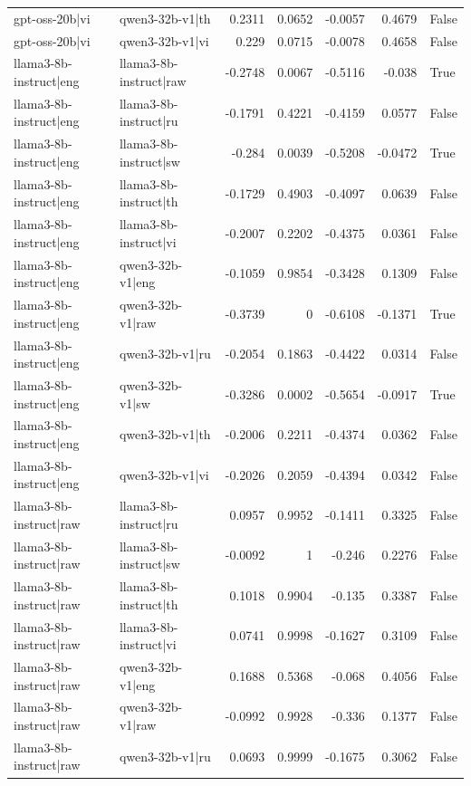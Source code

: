 \begin{table}
\begin{tabular}{l l r r r r l}
gpt-oss-20b|vi & qwen3-32b-v1|th & 0.2311 & 0.0652 & -0.0057 & 0.4679 & False \\
gpt-oss-20b|vi & qwen3-32b-v1|vi & 0.229 & 0.0715 & -0.0078 & 0.4658 & False \\
llama3-8b-instruct|eng & llama3-8b-instruct|raw & -0.2748 & 0.0067 & -0.5116 & -0.038 & True \\
llama3-8b-instruct|eng & llama3-8b-instruct|ru & -0.1791 & 0.4221 & -0.4159 & 0.0577 & False \\
llama3-8b-instruct|eng & llama3-8b-instruct|sw & -0.284 & 0.0039 & -0.5208 & -0.0472 & True \\
llama3-8b-instruct|eng & llama3-8b-instruct|th & -0.1729 & 0.4903 & -0.4097 & 0.0639 & False \\
llama3-8b-instruct|eng & llama3-8b-instruct|vi & -0.2007 & 0.2202 & -0.4375 & 0.0361 & False \\
llama3-8b-instruct|eng & qwen3-32b-v1|eng & -0.1059 & 0.9854 & -0.3428 & 0.1309 & False \\
llama3-8b-instruct|eng & qwen3-32b-v1|raw & -0.3739 & 0 & -0.6108 & -0.1371 & True \\
llama3-8b-instruct|eng & qwen3-32b-v1|ru & -0.2054 & 0.1863 & -0.4422 & 0.0314 & False \\
llama3-8b-instruct|eng & qwen3-32b-v1|sw & -0.3286 & 0.0002 & -0.5654 & -0.0917 & True \\
llama3-8b-instruct|eng & qwen3-32b-v1|th & -0.2006 & 0.2211 & -0.4374 & 0.0362 & False \\
llama3-8b-instruct|eng & qwen3-32b-v1|vi & -0.2026 & 0.2059 & -0.4394 & 0.0342 & False \\
llama3-8b-instruct|raw & llama3-8b-instruct|ru & 0.0957 & 0.9952 & -0.1411 & 0.3325 & False \\
llama3-8b-instruct|raw & llama3-8b-instruct|sw & -0.0092 & 1 & -0.246 & 0.2276 & False \\
llama3-8b-instruct|raw & llama3-8b-instruct|th & 0.1018 & 0.9904 & -0.135 & 0.3387 & False \\
llama3-8b-instruct|raw & llama3-8b-instruct|vi & 0.0741 & 0.9998 & -0.1627 & 0.3109 & False \\
llama3-8b-instruct|raw & qwen3-32b-v1|eng & 0.1688 & 0.5368 & -0.068 & 0.4056 & False \\
llama3-8b-instruct|raw & qwen3-32b-v1|raw & -0.0992 & 0.9928 & -0.336 & 0.1377 & False \\
llama3-8b-instruct|raw & qwen3-32b-v1|ru & 0.0693 & 0.9999 & -0.1675 & 0.3062 & False \\

\end{tabular}
\end{table}
